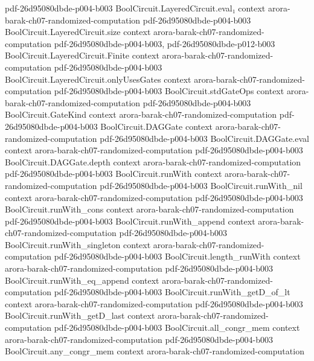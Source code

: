 \begin{theorem}
  {pdf-26d95080dbde-p004-b003}
\proofstep
  {BoolCircuit.LayeredCircuit.eval₁}
  {context}
  {arora-barak-ch07-randomized-computation}
  {pdf-26d95080dbde-p004-b003}
\proofstep
  {BoolCircuit.LayeredCircuit.size}
  {context}
  {arora-barak-ch07-randomized-computation}
  {pdf-26d95080dbde-p004-b003,
    pdf-26d95080dbde-p012-b003}
\proofstep
  {BoolCircuit.LayeredCircuit.Finite}
  {context}
  {arora-barak-ch07-randomized-computation}
  {pdf-26d95080dbde-p004-b003}
\proofstep
  {BoolCircuit.LayeredCircuit.onlyUsesGates}
  {context}
  {arora-barak-ch07-randomized-computation}
  {pdf-26d95080dbde-p004-b003}
\proofstep
  {BoolCircuit.stdGateOps}
  {context}
  {arora-barak-ch07-randomized-computation}
  {pdf-26d95080dbde-p004-b003}
\proofstep
  {BoolCircuit.GateKind}
  {context}
  {arora-barak-ch07-randomized-computation}
  {pdf-26d95080dbde-p004-b003}
\proofstep
  {BoolCircuit.DAGGate}
  {context}
  {arora-barak-ch07-randomized-computation}
  {pdf-26d95080dbde-p004-b003}
\proofstep
  {BoolCircuit.DAGGate.eval}
  {context}
  {arora-barak-ch07-randomized-computation}
  {pdf-26d95080dbde-p004-b003}
\proofstep
  {BoolCircuit.DAGGate.depth}
  {context}
  {arora-barak-ch07-randomized-computation}
  {pdf-26d95080dbde-p004-b003}
\proofstep
  {BoolCircuit.runWith}
  {context}
  {arora-barak-ch07-randomized-computation}
  {pdf-26d95080dbde-p004-b003}
\proofstep
  {BoolCircuit.runWith_nil}
  {context}
  {arora-barak-ch07-randomized-computation}
  {pdf-26d95080dbde-p004-b003}
\proofstep
  {BoolCircuit.runWith_cons}
  {context}
  {arora-barak-ch07-randomized-computation}
  {pdf-26d95080dbde-p004-b003}
\proofstep
  {BoolCircuit.runWith_append}
  {context}
  {arora-barak-ch07-randomized-computation}
  {pdf-26d95080dbde-p004-b003}
\proofstep
  {BoolCircuit.runWith_singleton}
  {context}
  {arora-barak-ch07-randomized-computation}
  {pdf-26d95080dbde-p004-b003}
\proofstep
  {BoolCircuit.length_runWith}
  {context}
  {arora-barak-ch07-randomized-computation}
  {pdf-26d95080dbde-p004-b003}
\proofstep
  {BoolCircuit.runWith_eq_append}
  {context}
  {arora-barak-ch07-randomized-computation}
  {pdf-26d95080dbde-p004-b003}
\proofstep
  {BoolCircuit.runWith_getD_of_lt}
  {context}
  {arora-barak-ch07-randomized-computation}
  {pdf-26d95080dbde-p004-b003}
\proofstep
  {BoolCircuit.runWith_getD_last}
  {context}
  {arora-barak-ch07-randomized-computation}
  {pdf-26d95080dbde-p004-b003}
\proofstep
  {BoolCircuit.all_congr_mem}
  {context}
  {arora-barak-ch07-randomized-computation}
  {pdf-26d95080dbde-p004-b003}
\proofstep
  {BoolCircuit.any_congr_mem}
  {context}
  {arora-barak-ch07-randomized-computation}

\end{theorem}
